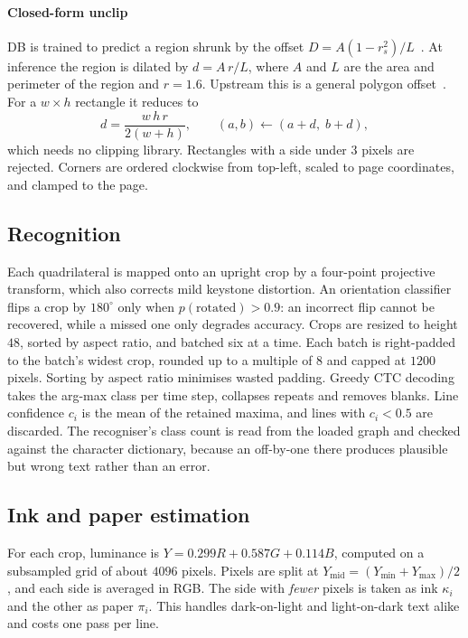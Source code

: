 \documentclass[journal]{IEEEtran}
\theoremstyle{definition}
\begin{document}
\paragraph{Closed-form unclip}
DB is trained to predict a region shrunk by the offset
$D=A(1-r_s^2)/L$~\cite{liao2020db}. At inference the region is dilated by
$d=A\,r/L$, where $A$ and $L$ are the area and perimeter of the region and
$r=1.6$. Upstream this is a general polygon offset~\cite{vatti1992clip}. For a
$w\times h$ rectangle it reduces to
\begin{equation}\label{eq:unclip}
  d=\frac{w\,h\,r}{2(w+h)},\qquad (a,b)\leftarrow(a+d,\;b+d),
\end{equation}
which needs no clipping library. Rectangles with a side under $3$ pixels are
rejected. Corners are ordered clockwise from top-left, scaled to page
coordinates, and clamped to the page.

\subsection{Recognition}\label{sec:rec}
Each quadrilateral is mapped onto an upright crop by a four-point projective
transform, which also corrects mild keystone distortion. An orientation
classifier flips a crop by $180^\circ$ only when
$p(\text{rotated})>0.9$: an incorrect flip cannot be recovered, while a missed
one only degrades accuracy. Crops are resized to height $48$, sorted by aspect
ratio, and batched six at a time. Each batch is right-padded to the batch's
widest crop, rounded up to a multiple of $8$ and capped at $1200$ pixels.
Sorting by aspect ratio minimises wasted padding. Greedy CTC
decoding~\cite{graves2006ctc} takes the arg-max class per time step, collapses
repeats and removes blanks. Line confidence $c_i$ is the mean of the retained
maxima, and lines with $c_i<0.5$ are discarded. The recogniser's class count
is read from the loaded graph and checked against the character dictionary,
because an off-by-one there produces plausible but wrong text rather than an
error.

\subsection{Ink and paper estimation}\label{sec:color}
For each crop, luminance is $Y=0.299R+0.587G+0.114B$, computed on a
subsampled grid of about $4096$ pixels. Pixels are split at
$Y_{\mathrm{mid}}=(Y_{\min}+Y_{\max})/2$, and each side is averaged in RGB. The
side with \emph{fewer} pixels is taken as ink $\kappa_i$ and the other as
paper $\pi_i$. This handles dark-on-light and light-on-dark text alike and
costs one pass per line.
\end{document}
